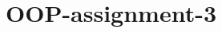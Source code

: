 \chapter{OOP-\/assignment-\/3 }
\hypertarget{md__r_e_a_d_m_e}{}\label{md__r_e_a_d_m_e}
\label{md__r_e_a_d_m_e_autotoc_md0}%
%
